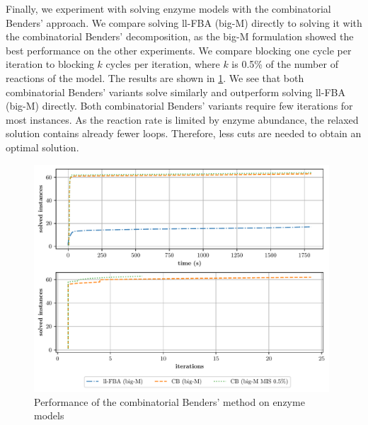 \newpage
Finally, we experiment with solving enzyme models with the combinatorial Benders' approach. We compare solving \textsf{ll-FBA (big-M)} directly to solving it with the combinatorial Benders' decomposition, as the big-M formulation showed the best performance on the other experiments. We compare blocking one cycle per iteration to blocking $k$ cycles per iteration, where $k$ is 0.5\% of the number of reactions of the model. The results are shown in \cref{fig:comparison_gecko}.
We see that both combinatorial Benders' variants solve similarly and outperform solving \textsf{ll-FBA (big-M)} directly. Both combinatorial Benders' variants require few iterations for most instances. As the reaction rate is limited by enzyme abundance, the relaxed solution contains already fewer loops. Therefore, less cuts are needed to obtain an optimal solution.
\vspace*{-\baselineskip}

\begin{figure}[h!]
    \centering
    \includegraphics[width=0.983\textwidth]{Images/comparison_solved_instances_gecko_1.0e-8.pdf}
    \caption{\label{fig:comparison_gecko} Performance of the combinatorial Benders' method on enzyme models}
\end{figure}

